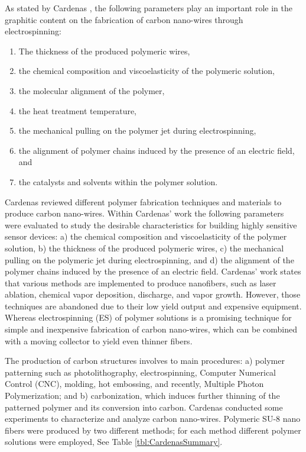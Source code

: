 As stated by Cardenas \cite{Cardenas2017}, the following parameters play an important role in the graphitic content on the fabrication of carbon nano-wires through electrospinning:

\begin{enumerate}
\item The thickness of the produced polymeric wires,
\item the chemical composition and viscoelasticity of the polymeric solution,
\item the molecular alignment of the polymer,
\item the heat treatment temperature,
\item the mechanical pulling on the polymer jet during electrospinning,
\item the alignment of polymer chains induced by the presence of an electric field, and
\item the catalysts and solvents within the polymer solution.
\end{enumerate}

Cardenas reviewed different polymer fabrication techniques and materials to produce carbon nano-wires. Within Cardenas' work the following parameters were evaluated to study the desirable characteristics for building highly sensitive sensor devices: a) the chemical composition and viscoelasticity of the polymer solution, b) the thickness of the produced polymeric wires, c) the mechanical pulling on the polymeric jet during electrospinning, and d) the alignment of the polymer chains induced by the presence of an electric field. Cardenas' work states that various methods are implemented to produce nanofibers, such as laser ablation, chemical vapor deposition, discharge, and vapor growth. However, those techniques are abandoned due to their low yield output and expensive equipment. Whereas electrospinning (ES) of polymer solutions is a promising technique for simple and inexpensive fabrication of carbon nano-wires, which can be combined with a moving collector to yield even thinner fibers.

The production of carbon structures involves to main procedures: a) polymer patterning such as photolithography, electrospinning, Computer Numerical Control (CNC), molding, hot embossing, and recently, Multiple Photon Polymerization; and b) carbonization, which induces further thinning of the patterned polymer and its conversion into carbon. Cardenas conducted some experiments to characterize and analyze carbon nano-wires. Polymeric SU-8 nano fibers were produced by two different methods; for each method different polymer solutions were employed, See Table \ref{tbl:CardenasSummary}.

